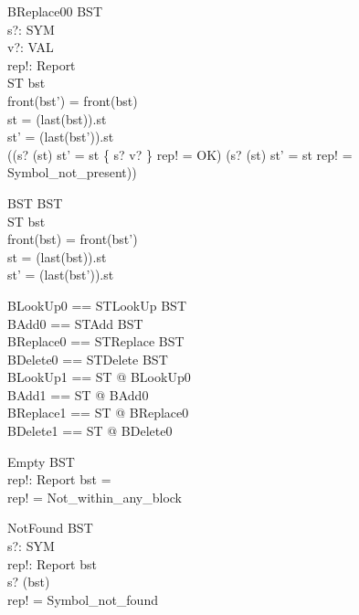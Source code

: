 \begin{schema}{BReplace00}
  \Delta BST \\
  s?: SYM \\
  v?: VAL \\
  rep!: Report \\
  \Delta ST
\where
  bst \neq \langle\rangle \\
  front(bst') = front(bst) \\
  st = (last(bst)).st \\
  st' = (last(bst')).st \\
  ((s? \in \dom(st) \land st' = st \oplus \{ s? \mapsto v? \} \land rep! = OK)
    \lor
    (s? \notin \dom(st) \land st' = st \land rep! = Symbol\_not\_present))
\end{schema}

\begin{schema}{\Phi BST}
  \Delta BST \\
  \Delta ST
\where
  bst \neq \langle\rangle \\
  front(bst) = front(bst') \\
  st = (last(bst)).st \\
  st' = (last(bst')).st
\end{schema}

\begin{zed}
  BLookUp0 == STLookUp \land \Phi BST \\
  BAdd0 == STAdd \land \Phi BST \\
  BReplace0 == STReplace \land \Phi BST \\
  BDelete0 == STDelete \land \Phi BST \\

  BLookUp1 == \exists \Delta ST @ BLookUp0 \\
  BAdd1 == \exists \Delta ST @ BAdd0 \\
  BReplace1 == \exists \Delta ST @ BReplace0 \\
  BDelete1 == \exists \Delta ST @ BDelete0
\end{zed}

\begin{schema}{Empty}
  \Xi BST \\
  rep!: Report
\where
  bst = \langle\rangle \\
  rep! = Not\_within\_any\_block \\
\end{schema}

\begin{schema}{NotFound}
  \Xi BST \\
  s?: SYM \\
  rep!: Report
\where
  bst \neq \langle\rangle \\
  s? \notin \dom(\distro bst) \\
  rep! = Symbol\_not\_found \\
\end{schema}

